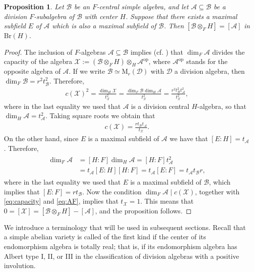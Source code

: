\documentclass[oneside]{amsart}
\newtheorem{proposition}[theorem]{Proposition}
\theoremstyle{remark}
\newcommand{\M}{\mathrm{M }}
\newcommand{\cA}{\mathcal{A}}
\newcommand{\cB}{\mathcal{B}}
\newcommand{\cX}{\mathcal X}
\numberwithin{equation}{section}
\begin{document}
\begin{proposition}\label{prop:inclusion of algebras}
  Let $\cB$ be an $F$-central simple algebra, and let $\cA\subseteq \cB$ be a division $F$-subalgebra of $\cB$ with center $H$. Suppose that there exists a maximal subfield $E$ of $\cA$ which is also a maximal subfield of $\cB$. Then $    [\cB\otimes_F H] = [\cA]$ in $\mathrm{Br}(H) $. 
\end{proposition}
 \begin{proof}
   The inclusion of $F$-algebras $\cA\subseteq \cB$ implies (cf. \cite[Theorem~2.7]{Yu12}) that $\dim_F\cA$ divides the capacity of the algebra $\cX := (\cB\otimes_F H)\otimes_H \cA^{\mathrm{op}}$, where $\cA^{\mathrm{op}}$ stands for the opposite algebra of $\cA$. If we write $\cB\simeq \M_r(\mathcal{D})$ with $\mathcal{D}$ a division algebra, then $\dim_F\cB=r^2 t_\cB^2$. Therefore,
   \begin{align*}
     c(\cX)^2 = \frac{\dim_H\cX}{t_\cX^2} = \frac{\dim_F\cB \dim_H\cA}{t_\cX^2}=\frac{r^2t_\cB^2t_\cA^2}{t_\cX^2},
   \end{align*}
where in the last equality we used that $\cA$ is a division central $H$-algebra, so that $\dim_H\cA=t_\cA^2$. Taking square roots we obtain that
  \begin{align}\label{eq:capacity}
    c(\cX) = \frac{rt_\cB t_\cA}{t_\cX}.
  \end{align}
  On the other hand, since $E$ is a maximal subfield of $\cA$ we have that $[E\colon H]=t_\cA$. Therefore,
  \begin{align}\label{eq:AF}
    \begin{split}
      \dim_F\cA &= [H\colon F] \dim_H\cA =[H\colon F]t_\cA^2  \\ &=t_\cA [E\colon H][H\colon F]= t_\cA [E\colon F]=t_\cA t_\cB r,
          \end{split}
  \end{align}
  where in the last equality we used that $E$ is a maximal subfield of $\cB$, which implies that $[E\colon F]=rt_\cB $. Now the condition $\dim_F\cA \mid c(\cX)$, together with \eqref{eq:capacity} and \eqref{eq:AF}, implies that $t_\cX=1$. This means that $0 = [\cX]=[\cB\otimes_F H]- [\cA]$, and the proposition follows. 
  
 \end{proof}


We introduce a terminology that will be used in subsequent sections. Recall that a simple abelian variety is called of the first kind if the center of its endomorphism algebra is totally real; that is, if its endomorphism algebra has Albert type I, II, or III in the classification of division algebras with a positive involution. 
\end{document}
